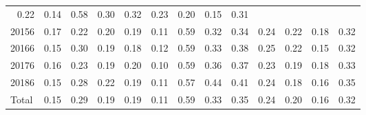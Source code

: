 \begin{table}[!h]
\begin{tabular}{lllllllllllll}
  \multicolumn{1}{r}{0.22} &
  \multicolumn{1}{r}{0.14} &
  \multicolumn{1}{r}{0.58} &
  \multicolumn{1}{r}{0.30} &
  \multicolumn{1}{r}{0.32} &
  \multicolumn{1}{r}{0.23} &
  \multicolumn{1}{r}{0.20} &
  \multicolumn{1}{r}{0.15} &
  \multicolumn{1}{r}{0.31} \\
\multicolumn{1}{l}{\hspace{1em}20156} &
  \multicolumn{1}{|r}{0.17} &
  \multicolumn{1}{r}{0.22} &
  \multicolumn{1}{r}{0.20} &
  \multicolumn{1}{r}{0.19} &
  \multicolumn{1}{r}{0.11} &
  \multicolumn{1}{r}{0.59} &
  \multicolumn{1}{r}{0.32} &
  \multicolumn{1}{r}{0.34} &
  \multicolumn{1}{r}{0.24} &
  \multicolumn{1}{r}{0.22} &
  \multicolumn{1}{r}{0.18} &
  \multicolumn{1}{r}{0.32} \\
\multicolumn{1}{l}{\hspace{1em}20166} &
  \multicolumn{1}{|r}{0.15} &
  \multicolumn{1}{r}{0.30} &
  \multicolumn{1}{r}{0.19} &
  \multicolumn{1}{r}{0.18} &
  \multicolumn{1}{r}{0.12} &
  \multicolumn{1}{r}{0.59} &
  \multicolumn{1}{r}{0.33} &
  \multicolumn{1}{r}{0.38} &
  \multicolumn{1}{r}{0.25} &
  \multicolumn{1}{r}{0.22} &
  \multicolumn{1}{r}{0.15} &
  \multicolumn{1}{r}{0.32} \\
\multicolumn{1}{l}{\hspace{1em}20176} &
  \multicolumn{1}{|r}{0.16} &
  \multicolumn{1}{r}{0.23} &
  \multicolumn{1}{r}{0.19} &
  \multicolumn{1}{r}{0.20} &
  \multicolumn{1}{r}{0.10} &
  \multicolumn{1}{r}{0.59} &
  \multicolumn{1}{r}{0.36} &
  \multicolumn{1}{r}{0.37} &
  \multicolumn{1}{r}{0.23} &
  \multicolumn{1}{r}{0.19} &
  \multicolumn{1}{r}{0.18} &
  \multicolumn{1}{r}{0.33} \\
\multicolumn{1}{l}{\hspace{1em}20186} &
  \multicolumn{1}{|r}{0.15} &
  \multicolumn{1}{r}{0.28} &
  \multicolumn{1}{r}{0.22} &
  \multicolumn{1}{r}{0.19} &
  \multicolumn{1}{r}{0.11} &
  \multicolumn{1}{r}{0.57} &
  \multicolumn{1}{r}{0.44} &
  \multicolumn{1}{r}{0.41} &
  \multicolumn{1}{r}{0.24} &
  \multicolumn{1}{r}{0.18} &
  \multicolumn{1}{r}{0.16} &
  \multicolumn{1}{r}{0.35} \\
\multicolumn{1}{l}{\hspace{1em}Total} &
  \multicolumn{1}{|r}{0.15} &
  \multicolumn{1}{r}{0.29} &
  \multicolumn{1}{r}{0.19} &
  \multicolumn{1}{r}{0.19} &
  \multicolumn{1}{r}{0.11} &
  \multicolumn{1}{r}{0.59} &
  \multicolumn{1}{r}{0.33} &
  \multicolumn{1}{r}{0.35} &
  \multicolumn{1}{r}{0.24} &
  \multicolumn{1}{r}{0.20} &
  \multicolumn{1}{r}{0.16} &
  \multicolumn{1}{r}{0.32} \\
\cline{1-13}
\end{tabular}
\end{table}
